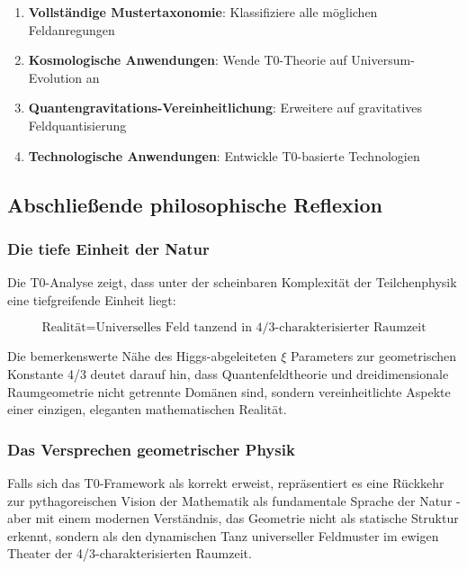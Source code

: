 	\begin{enumerate}
		\item \textbf{Vollständige Mustertaxonomie}: Klassifiziere alle möglichen Feldanregungen
		\item \textbf{Kosmologische Anwendungen}: Wende T0-Theorie auf Universum-Evolution an
		\item \textbf{Quantengravitations-Vereinheitlichung}: Erweitere auf gravitatives Feldquantisierung
		\item \textbf{Technologische Anwendungen}: Entwickle T0-basierte Technologien
	\end{enumerate}
	
	\subsection{Abschließende philosophische Reflexion}
	\label{subsec:abschliessende_reflexion}
	
	\subsubsection{Die tiefe Einheit der Natur}
	\label{subsubsec:tiefe_einheit}
	
	Die T0-Analyse zeigt, dass unter der scheinbaren Komplexität der Teilchenphysik eine tiefgreifende Einheit liegt:
	
	\begin{equation}
		\boxed{\text{Realität} = \text{Universelles Feld tanzend in 4/3-charakterisierter Raumzeit}}
		\label{eq:ultimative_realitaet}
	\end{equation}
	
	Die bemerkenswerte Nähe des Higgs-abgeleiteten $\xi$ Parameters zur geometrischen Konstante 4/3 deutet darauf hin, dass Quantenfeldtheorie und dreidimensionale Raumgeometrie nicht getrennte Domänen sind, sondern vereinheitlichte Aspekte einer einzigen, eleganten mathematischen Realität.
	
	\subsubsection{Das Versprechen geometrischer Physik}
	\label{subsubsec:versprechen_geometrischer_physik}
	
	Falls sich das T0-Framework als korrekt erweist, repräsentiert es eine Rückkehr zur pythagoreischen Vision der Mathematik als fundamentale Sprache der Natur - aber mit einem modernen Verständnis, das Geometrie nicht als statische Struktur erkennt, sondern als den dynamischen Tanz universeller Feldmuster im ewigen Theater der 4/3-charakterisierten Raumzeit.
	
